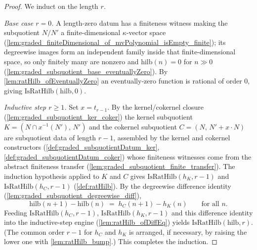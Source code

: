 \begin{proof}
    \leanok
  We induct on the length \(r\).

  \emph{Base case \(r = 0\).} A length-zero datum has a finiteness witness making the
  subquotient \(N/N'\) a finite-dimensional \(\kappa\)-vector space
  (\cref{lem:graded_finiteDimensional_of_mvPolynomial_isEmpty_finite}); its degreewise
  images form an independent family inside that finite-dimensional space, so only
  finitely many are nonzero and \(\mathrm{hilb}(n) = 0\) for \(n \gg 0\)
  (\cref{lem:graded_subquotient_base_eventuallyZero}). By
  \cref{lem:ratHilb_ofEventuallyZero} an eventually-zero function is rational of order
  \(0\), giving \(\mathrm{IsRatHilb}(\mathrm{hilb}, 0)\).

  \emph{Inductive step \(r \ge 1\).} Set \(x = t_{r-1}\). By the kernel/cokernel
  closure (\cref{lem:graded_subquotient_ker_coker}) the kernel subquotient
  \(K = (N \cap x^{-1}(N'),\, N')\) and the cokernel subquotient
  \(C = (N,\, N' + x \cdot N)\) are subquotient data of length \(r-1\), assembled by
  the kernel and cokernel constructors (\cref{def:graded_subquotientDatum_ker},
  \cref{def:graded_subquotientDatum_coker}) whose finiteness witnesses come from the
  abstract finiteness transfer (\cref{lem:graded_subquotient_finite_transfer}). The
  induction hypothesis applied
  to \(K\) and \(C\) gives \(\mathrm{IsRatHilb}(h_K, r-1)\) and
  \(\mathrm{IsRatHilb}(h_C, r-1)\) (\cref{def:ratHilb}). By the degreewise
  difference identity (\cref{lem:graded_subquotient_degreewise_diff}),
  \[
    \mathrm{hilb}(n+1) - \mathrm{hilb}(n) \;=\; h_C(n+1) - h_K(n)
    \qquad \text{for all } n .
  \]
  Feeding \(\mathrm{IsRatHilb}(h_C, r-1)\), \(\mathrm{IsRatHilb}(h_K, r-1)\) and this
  difference identity into the inductive-step engine
  (\cref{lem:ratHilb_ofDiffEq}) yields \(\mathrm{IsRatHilb}(\mathrm{hilb}, r)\). (The
  common order \(r-1\) for \(h_C\) and \(h_K\) is arranged, if necessary, by raising
  the lower one with \cref{lem:ratHilb_bump}.) This completes the induction.
\end{proof}

